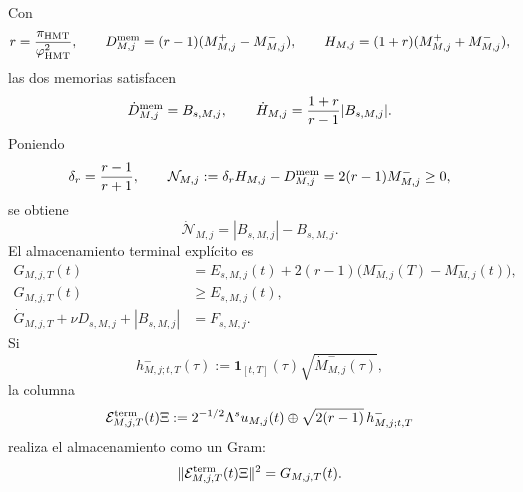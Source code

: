 Con
\begin{equation}
 r=\frac{\pi_{\rm HMT}}{\varphi_{\rm HMT}^2},
 \qquad
 D_{M,j}^{\rm mem}=(r-1)(M_{M,j}^+-M_{M,j}^-),
 \qquad
 H_{M,j}=(1+r)(M_{M,j}^++M_{M,j}^-),
 \label{eq:ns-import-dh}
\end{equation}
las dos memorias satisfacen
\begin{equation}
 \dot D_{M,j}^{\rm mem}=B_{s,M,j},
 \qquad
 \dot H_{M,j}=\frac{1+r}{r-1}|B_{s,M,j}|.
 \label{eq:ns-import-dh-dot}
\end{equation}
Poniendo
\[
 \delta_r=\frac{r-1}{r+1},
 \qquad
 \mathcal N_{M,j}:=\delta_rH_{M,j}-D_{M,j}^{\rm mem}
 =2(r-1)M_{M,j}^-\ge0,
\]
se obtiene
\begin{equation}
 \dot{\mathcal N}_{M,j}=|B_{s,M,j}|-B_{s,M,j}.
 \label{eq:ns-import-negative-memory}
\end{equation}
El almacenamiento terminal explícito es
\begin{equation}
 \begin{aligned}
 G_{M,j,T}(t)
 &=E_{s,M,j}(t)
   +2(r-1)\bigl(M_{M,j}^-(T)-M_{M,j}^-(t)\bigr),\\
 G_{M,j,T}(t)&\ge E_{s,M,j}(t),\\
 \dot G_{M,j,T}+\nu D_{s,M,j}+|B_{s,M,j}|
 &=F_{s,M,j}.
 \end{aligned}
 \label{eq:ns-import-terminal-storage}
\end{equation}
Si
\[
 h^-_{M,j;t,T}(\tau)
 :=\mathbf1_{[t,T]}(\tau)\sqrt{\dot M^-_{M,j}(\tau)},
\]
la columna
\begin{equation}
 \mathcal E_{M,j,T}^{\rm term}(t)\Xi
 :=2^{-1/2}\Lambda^su_{M,j}(t)
 \oplus\sqrt{2(r-1)}\,h^-_{M,j;t,T}
 \label{eq:ns-import-terminal-column}
\end{equation}
realiza el almacenamiento como un Gram:
\begin{equation}
 \|\mathcal E_{M,j,T}^{\rm term}(t)\Xi\|^2
 =G_{M,j,T}(t).
 \label{eq:ns-import-terminal-gram}
\end{equation}

